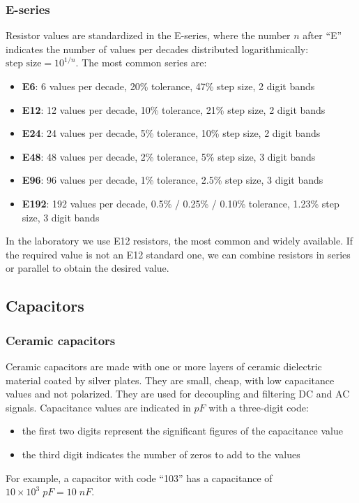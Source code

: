 \subsubsection*{E-series}
Resistor values are standardized in the E-series, where the number \(n\) after ``E'' indicates the number of values per decades
distributed logarithmically: \(\text{step size} = 10 ^ {1/n}\). The most common series are:
\begin{itemize}
	\item \textbf{E6}: 6 values per decade, 20\% tolerance, 47\% step size, 2 digit bands
	\item \textbf{E12}: 12 values per decade, 10\% tolerance, 21\% step size, 2 digit bands
	\item \textbf{E24}: 24 values per decade, 5\% tolerance, 10\% step size, 2 digit bands
	\item \textbf{E48}: 48 values per decade, 2\% tolerance, 5\% step size, 3 digit bands
	\item \textbf{E96}: 96 values per decade, 1\% tolerance, 2.5\% step size, 3 digit bands
	\item \textbf{E192}: 192 values per decade, 0.5\% / 0.25\% / 0.10\% tolerance, 1.23\% step size, 3 digit bands
\end{itemize}

\noindent
In the laboratory we use E12 resistors, the most common and widely available. If the required value is not an E12 standard one,
we can combine resistors in series or parallel to obtain the desired value.

\subsection{Capacitors}
\subsubsection*{Ceramic capacitors}
Ceramic capacitors are made with one or more layers of ceramic dielectric material coated by silver plates. They are small, cheap,
with low capacitance values and not polarized. They are used for decoupling and filtering DC and AC signals. Capacitance values are
indicated in \(pF\) with a three-digit code:
\begin{itemize}
	\item the first two digits represent the significant figures of the capacitance value
	\item the third digit indicates the number of zeros to add to the values
\end{itemize}
For example, a capacitor with code ``103'' has a capacitance of \(10 \times 10^3 \; pF = 10 \; nF\).

